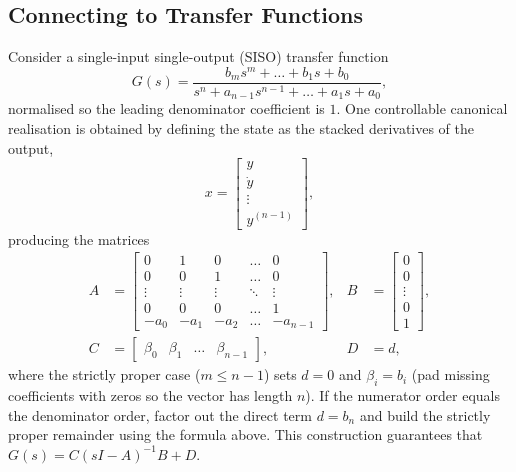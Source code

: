 \subsection{Connecting to Transfer Functions}
Consider a single-input single-output (SISO) transfer function
\[
    G(s) = \frac{b_{m}s^{m} + \dots + b_1 s + b_0}{s^{n} + a_{n-1} s^{n-1} + \dots + a_1 s + a_0},
\]
normalised so the leading denominator coefficient is $1$. One controllable canonical realisation is obtained by defining the state as the stacked derivatives of the output,
\[
    x = \begin{bmatrix} y \\ \dot{y} \\ \vdots \\ y^{(n-1)} \end{bmatrix},
\]
producing the matrices
\begin{align}
    A &= \begin{bmatrix}
        0 & 1 & 0 & \dots & 0 \\
        0 & 0 & 1 & \dots & 0 \\
        \vdots & \vdots & \vdots & \ddots & \vdots \\
        0 & 0 & 0 & \dots & 1 \\
        -a_0 & -a_1 & -a_2 & \dots & -a_{n-1}
    \end{bmatrix}, &
    B &= \begin{bmatrix} 0 \\ 0 \\ \vdots \\ 0 \\ 1 \end{bmatrix},\\
    C &= \begin{bmatrix} \beta_0 & \beta_1 & \dots & \beta_{n-1} \end{bmatrix}, &
    D &= d,
\end{align}
where the strictly proper case ($m \leq n-1$) sets $d = 0$ and $\beta_i = b_i$ (pad missing coefficients with zeros so the vector has length $n$). If the numerator order equals the denominator order, factor out the direct term $d = b_n$ and build the strictly proper remainder using the formula above. This construction guarantees that $G(s) = C (sI - A)^{-1} B + D$.

